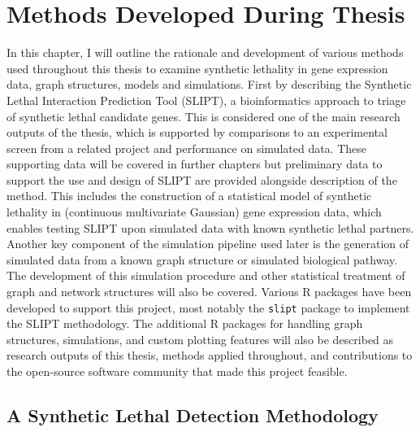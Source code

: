 \chapter{Methods Developed During Thesis}
\label{chap:methods_dev}

In this chapter, I will outline the rationale and development of various methods used throughout this thesis to examine synthetic lethality in gene expression data, graph structures, models and simulations. First by describing the Synthetic Lethal Interaction Prediction Tool (SLIPT), a bioinformatics approach to triage of synthetic lethal candidate genes. This is considered one of the main research outputs of the thesis, which is supported by comparisons to an experimental screen from a related project and performance on simulated data. These supporting data will be covered in further chapters but preliminary data to support the use and design of SLIPT are provided alongside description of the method. This includes the construction of a statistical model of synthetic lethality in (continuous multivariate Gaussian) gene expression data, which enables testing SLIPT upon simulated data with known synthetic lethal partners. Another key component of the simulation pipeline used later is the generation of simulated data from a known graph structure or simulated biological pathway. The development of this simulation procedure and other statistical treatment of graph and network structures will also be covered. Various R packages have been developed to support this project, most notably the \texttt{slipt} package to implement the SLIPT methodology. The additional R packages for handling graph structures, simulations, and custom plotting features will also be described as research outputs of this thesis, methods applied throughout, and contributions to the open-source software community that made this project feasible.

\section{A Synthetic Lethal Detection Methodology} \label{methods:SLIPT}

